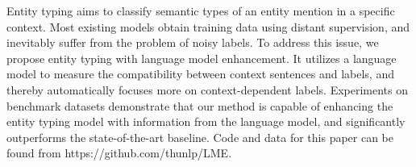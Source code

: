 Entity typing aims to classify semantic types of an entity mention in a specific context. Most existing models obtain training data using distant supervision, and inevitably suffer from the problem of noisy labels. To address this issue, we propose entity typing with language model enhancement. It utilizes a language model to measure the compatibility between context sentences and labels, and thereby automatically focuses more on context-dependent labels. Experiments on benchmark datasets demonstrate that our method is capable of enhancing the entity typing model with information from the language model, and significantly outperforms the state-of-the-art baseline. Code and data for this paper can be found from https://github.com/thunlp/LME.
